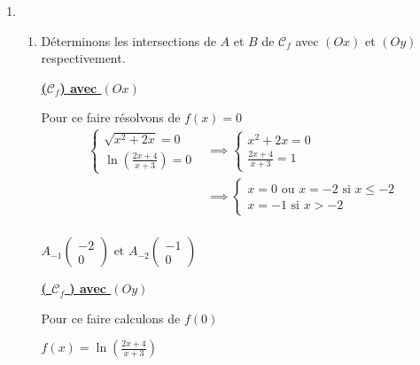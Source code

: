 \documentclass[12pt,a4paper]{article}
\begin{document}
\begin{enumerate}
\begin{enumerate}
\begin{center}
\end{center}

\end{enumerate}
\item
\begin{enumerate}
    \item Déterminons les intersections de $A$ et $B$ de $\mathcal{C}_{f}$ avec $(Ox)$ et $(Oy)$ respectivement.
    
    \underline{ \textbf{ ($\mathcal{C}_{f}$) avec $(Ox)$ } }

    Pour ce faire résolvons de $f(x)=0$
\[
\begin{aligned}
    \begin{cases}
    \sqrt{x^2 + 2x} = 0 \\
    \ln\left( \frac{2x+4}{x+3} \right) = 0
\end{cases} &\implies
\begin{cases}
    x^2 + 2x = 0 \\
    \frac{2x+4}{x+3} = 1
\end{cases}\\
 &\implies
\begin{cases}
    x= 0 \text{ ou } x = -2 \text{ si } x \leq -2\\
    x=-1 \text{ si } x > -2
\end{cases}\\
\end{aligned}
\]

\( A_{-1} \begin{pmatrix} -2 \\ 0 \end{pmatrix} \text{ et } A_{-2} \begin{pmatrix} -1 \\ 0 \end{pmatrix} \) 

\underline{ \textbf{ ( \( \mathcal{C}_{f} \) ) avec \( (Oy) \) } }

    Pour ce faire calculons de $f(0)$

    \( f(x) = \ln\left( \frac{2x+4}{x+3} \right) \)
    

\end{enumerate}
\end{enumerate}
\end{document}
